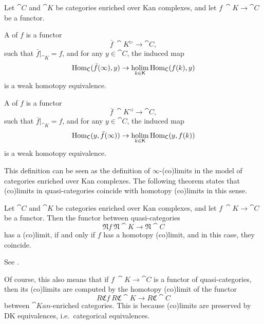 \begin{definition}
    Let $\cat C$ and $\cat K$ be categories enriched over Kan complexes,
    and let $f\:\cat K\to\cat C$ be a functor.
    \begin{itms}
        \item A  of $f$ is a functor 
        \[ \bar f\:\cat K^\vartriangleright\to\cat C, \]
        such that $\bar f|_{\cat K}=f$, and for any $y\in\cat C$, the induced map 
        \[ \operatorname{Hom}_{\mathsf{C}}(\bar f(\infty),y)\to\mathop{\operatorname{holim}}\limits_{k\in\mathsf{K}}\operatorname{Hom}_{\mathsf{C}}(f(k),y) \]
        is a weak homotopy equivalence.

        \item A  of $f$ is a functor 
        \[ \bar f\:\cat K^\vartriangleleft\to\cat C, \]
        such that $\bar f|_{\cat K}=f$, and for any $y\in\cat C$, the induced map 
        \[ \operatorname{Hom}_{\mathsf{C}}(y,\bar f(\infty))\to\mathop{\operatorname{holim}}\limits_{k\in\mathsf{K}}\operatorname{Hom}_{\mathsf{C}}(y,f(k)) \]
        is a weak homotopy equivalence.
    \end{itms}
\end{definition}

This definition can be seen as the definition of $\infty$-(co)limits 
in the model of categories enriched over Kan complexes.
The following theorem states that
(co)limits in quasi-categories coincide with homotopy (co)limits in this sense.

\begin{theorem}
    Let $\cat C$ and $\cat K$ be categories enriched over Kan complexes,
    and let $f\:\cat K\to\cat C$ be a functor.
    Then the functor between quasi-categories
    \[ \mathfrak Nf\:\mathfrak N\cat K\to\mathfrak N\cat C \]
    has a (co)limit,
    if and only if $f$ has a homotopy (co)limit,
    and in this case, they coincide.
\end{theorem}

See \cite[Theorem~4.2.4.1]{htt}.

Of course, this also means that if $f\:\cat K\to\cat C$
is a functor of quasi-categories, then its (co)limits are computed by
the homotopy (co)limit of the functor
\[ R\mathfrak Cf\:R\mathfrak C\cat K\to R\mathfrak C\cat C \]
between $\cat{Kan}$-enriched categories.
This is because (co)limits are preserved by DK equivalences,
i.e.\ categorical equivalences.

